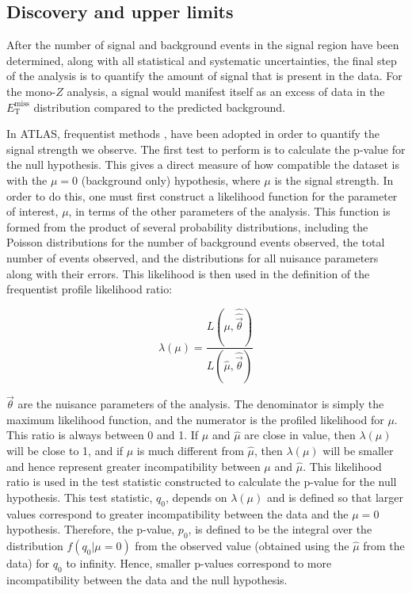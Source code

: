\subsection{Discovery and upper limits}
\label{sec:limits}

After the number of signal and background events in the signal region have been determined, along with all statistical and systematic uncertainties, the final step of the analysis is to quantify the amount of signal that is present in the data. For the mono-$Z$ analysis, a signal would manifest itself as an excess of data in the $E_\text{T}^\text{miss}$ distribution compared to the predicted background. 

In ATLAS, frequentist methods \cite{Cowan:2010js}, \cite{freqLimitRecs} have been adopted in order to quantify the signal strength we observe. The first test to perform is to calculate the p-value for the null hypothesis. This gives a direct measure of how compatible the dataset is with the $\mu=0$ (background only) hypothesis, where $\mu$ is the signal strength. In order to do this, one must first construct a likelihood function for the parameter of interest, $\mu$, in terms of the other parameters of the analysis.  This function is formed from the product of several probability distributions, including the Poisson distributions for the number of background events observed, the total number of events observed, and the distributions for all nuisance parameters along with their errors. This likelihood is then used in the definition of the frequentist profile likelihood ratio:

\begin{equation}
\lambda(\mu) = \frac{L(\mu, \hat{\hat{\vec{\theta}}})}{L(\hat{\mu}, \hat{\vec{\theta}})} 
\end{equation}

\noindent $\vec{\theta}$ are the nuisance parameters of the analysis. The denominator is simply the maximum likelihood function, and the numerator is the profiled likelihood for $\mu$. This ratio is always between 0 and 1. If $\mu$ and $\hat{\mu}$ are close in value, then $\lambda(\mu)$ will be close to 1, and if $\mu$ is much different from $\hat{\mu}$, then $\lambda(\mu)$ will be smaller and hence represent greater incompatibility between $\mu$ and $\hat{\mu}$. This likelihood ratio is used in the test statistic constructed to calculate the p-value for the null hypothesis. This test statistic,  $q_0$, depends on $\lambda(\mu)$ and is defined so that larger values correspond to greater incompatibility between the data and the $\mu=0$ hypothesis. Therefore, the p-value, $p_0$, is defined to be the integral over the distribution $f(q_0 | \mu=0)$ from the observed value (obtained using the $\hat{\mu}$ from the data) for $q_0$ to infinity. Hence, smaller p-values correspond to more incompatibility between the data and the null hypothesis.

